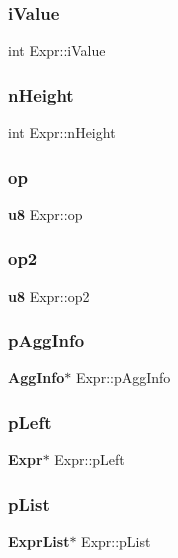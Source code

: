 \mbox{\label{struct_expr_a9ea4dff760e0008488807701c6102605}} 
\subsubsection{iValue}
{\footnotesize\ttfamily int Expr\+::i\+Value}

\mbox{\label{struct_expr_a5a893ea309f801f23404e7e5ac02732b}} 
\subsubsection{nHeight}
{\footnotesize\ttfamily int Expr\+::n\+Height}

\mbox{\label{struct_expr_a101c55ddb6c149d95f0327831eb78225}} 
\subsubsection{op}
{\footnotesize\ttfamily \textbf{ u8} Expr\+::op}

\mbox{\label{struct_expr_a0eacba0a2a6977e434b096b1cb9d5b9e}} 
\subsubsection{op2}
{\footnotesize\ttfamily \textbf{ u8} Expr\+::op2}

\mbox{\label{struct_expr_a4fde82477256ee85f3a906263549082a}} 
\subsubsection{pAggInfo}
{\footnotesize\ttfamily \textbf{ Agg\+Info}$\ast$ Expr\+::p\+Agg\+Info}

\mbox{\label{struct_expr_a0a78282ae0d696f4a25013a12e38b1ba}} 
\subsubsection{pLeft}
{\footnotesize\ttfamily \textbf{ Expr}$\ast$ Expr\+::p\+Left}

\mbox{\label{struct_expr_ac7107bf192a8080b919350925cc35dd8}} 
\subsubsection{pList}
{\footnotesize\ttfamily \textbf{ Expr\+List}$\ast$ Expr\+::p\+List}

